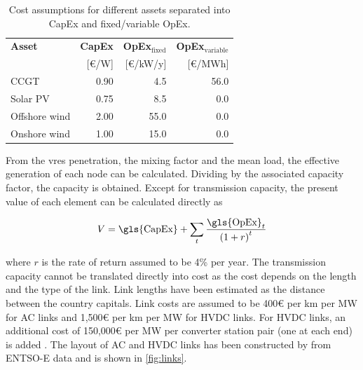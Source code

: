 \documentclass[a4paper, 5p, sort&compress]{elsarticle}%
\newcommand{\paren}[1]{\left(#1\right)}
\begin{document}
\begin{table}[h!]
  \centering
  \caption{Cost assumptions for different assets separated into
    \gls{CapEx} and fixed/variable \gls{OpEx}.}
  \label{tab:cost-assumptions}
  \begin{tabular}{lrrr}  \toprule
    \textbf{Asset} & \textbf{\gls{CapEx} }& \textbf{\gls{OpEx}$_{\text{fixed}}$} & \textbf{\gls{OpEx}$_{\text{variable}}$}\\
    & [\euro/W] & [\euro/kW/y] & [\euro/MWh]\\ \midrule
    CCGT & 0.90 & 4.5 & 56.0\\
    Solar PV & 0.75 & 8.5 & 0.0\\
    Offshore wind & 2.00 & 55.0 & 0.0\\
    Onshore wind & 1.00 & 15.0 & 0.0\\
    \bottomrule
  \end{tabular}
\end{table}

From the \gls{vres} penetration, the mixing factor and the mean load, the
effective generation of each node can be calculated. Dividing by the
associated capacity factor, the capacity is obtained. Except for
transmission capacity, the present value of each element can be
calculated directly as

\begin{equation}
  \label{eq:6}
  V = \text{\gls{CapEx}} + \sum_{t} \frac{\text{\gls{OpEx}}_{t}}{\paren{1 + r}^{t}}
\end{equation}

where $r$
is the rate of return assumed to be 4\% per year. The transmission capacity cannot be translated directly
into cost as the cost depends on the length and the type of the link. Link lengths have been
estimated as the distance between the country capitals. Link costs are assumed to be 400\euro{}
per km per MW for AC links and 1,500\euro{}
per km per MW for HVDC links. For HVDC links, an additional cost of 150,000\euro{}
per MW per converter station pair (one at each end) is added \cite{McKinsey, Schaber, Schaber2}. The
layout of AC and HVDC links has been constructed by \cite{rolando2014} from ENTSO-E data and is shown in \cref{fig:links}.

\end{document}
